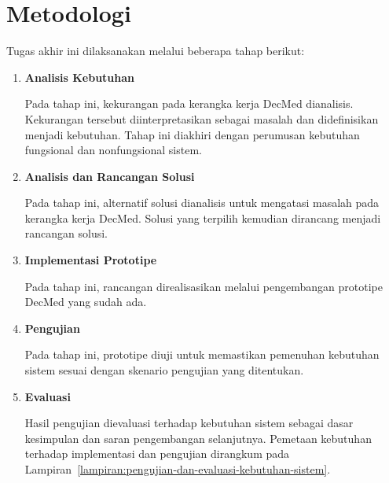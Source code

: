 \section{Metodologi}

Tugas akhir ini dilaksanakan melalui beberapa tahap berikut:

\begin{enumerate}
	\item \textbf{Analisis Kebutuhan}
	      \label{subsec:analisis-kebutuhan}

	      Pada tahap ini, kekurangan pada kerangka kerja DecMed dianalisis. Kekurangan tersebut diinterpretasikan sebagai masalah dan didefinisikan menjadi kebutuhan. Tahap ini diakhiri dengan perumusan kebutuhan fungsional dan nonfungsional sistem.

	\item \textbf{Analisis dan Rancangan Solusi}
	      \label{subsec:perancangan-arsitektur-dan-model-kontrol-akses}

	      Pada tahap ini, alternatif solusi dianalisis untuk mengatasi masalah pada kerangka kerja DecMed. Solusi yang terpilih kemudian dirancang menjadi rancangan solusi.

	\item \textbf{Implementasi Prototipe}
	      \label{subsec:implementasi-prototipe}

	      Pada tahap ini, rancangan direalisasikan melalui pengembangan prototipe DecMed yang sudah ada.

	\item \textbf{Pengujian}
	      \label{subsec:pengujian}

	      Pada tahap ini, prototipe diuji untuk memastikan pemenuhan kebutuhan sistem sesuai dengan skenario pengujian yang ditentukan.

	\item \textbf{Evaluasi}
	      \label{subsec:evaluasi}

	      Hasil pengujian dievaluasi terhadap kebutuhan sistem sebagai dasar kesimpulan dan saran pengembangan selanjutnya. Pemetaan kebutuhan terhadap implementasi dan pengujian dirangkum pada Lampiran~\ref{lampiran:pengujian-dan-evaluasi-kebutuhan-sistem}.
\end{enumerate}
